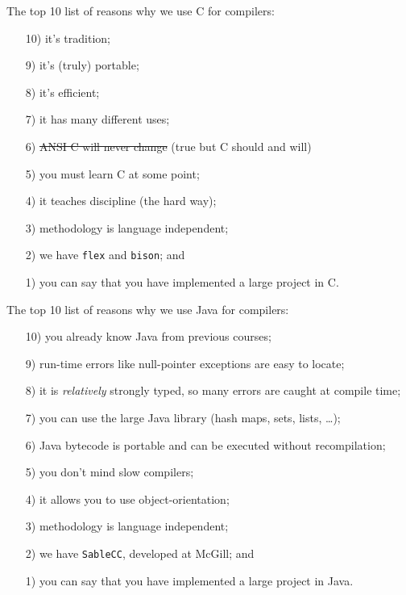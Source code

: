 \begin{slide*}
The top 10 list of reasons why we use C for compilers:\\
\begin{itemize}
\item[10)] it's tradition;
\item[9)] it's (truly) portable;
\item[8)] it's efficient;
\item[7)] it has many different uses;
\item[6)] \sout{ANSI C will never change} (true but C should and will)
\item[5)] you must learn C at some point;
\item[4)] it teaches discipline (the hard way);
\item[3)] methodology is language independent;
\item[2)] we have {\tt flex} and {\tt bison}; and
\item[1)] you can say that you have implemented a large project in C.
\end{itemize}
\vfil
\end{slide*}

\begin{slide*}
The top 10 list of reasons why we use Java for compilers:\\
\begin{small}
\begin{itemize}
\item[10)] you already know Java from previous courses;
\item[9)] run-time errors like null-pointer exceptions are easy to locate;
\item[8)] it is \emph{relatively} strongly typed, so many errors are caught at compile
time;
\item[7)] you can use the large Java library (hash maps, sets, lists, \ldots);
\item[6)] Java bytecode is portable and can be executed without recompilation;
\item[5)] you don't mind slow compilers;
\item[4)] it allows you to use object-orientation;
\item[3)] methodology is language independent;
\item[2)] we have {\tt SableCC}, developed at McGill; and
\item[1)] you can say that you have implemented a large project in Java.
\end{itemize}
\vfil
\end{small}
\end{slide*}

